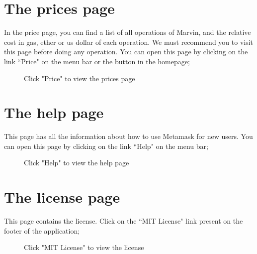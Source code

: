 \documentclass[ManualeUtente]{subfiles}
\begin{document}
\section{The prices page}
 In the price page, you can find a list of all operations of Marvin, and the relative cost in gas, ether or us dollar of each operation. We must recommend you to visit this page before doing any operation. You can open this page by clicking on the link \textquotedblleft Price" on the menu bar or the button in the homepage;
	\begin{figure}[H]
		\centering
		\caption{Click "Price" to view the prices page}
		\label{fig:Click "Price" to view the prices page}
	\end{figure}


\section{The help page}
 This page has all the information about how to use Metamask for new users. You can open this page by clicking on the link \textquotedblleft Help" on the menu bar;
	\begin{figure}[H]
		\centering
		\caption{Click "Help" to view the help page}
		\label{fig:Click "Help" to view the help page}
	\end{figure}

\newpage
\section{The license page}
This page contains the license. Click on the \textquotedblleft MIT License" link present on the footer of the application;
	\begin{figure}[H]
		\centering
		\caption{Click "MIT License" to view the license}
		\label{fig:Click "MIT License" to view the license}
	\end{figure}
\end{document}
